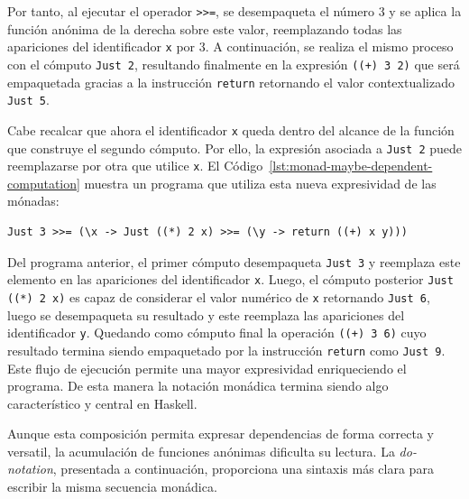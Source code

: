 Por tanto, al ejecutar el operador \verb|>>=|, se desempaqueta el número 3 y se aplica la función anónima de la derecha sobre este valor, reemplazando todas las apariciones del identificador \texttt{x} por 3. A continuación, se realiza el mismo proceso con el cómputo \verb|Just 2|, resultando finalmente en la expresión \texttt{((+) 3 2)} que será empaquetada gracias a la instrucción \texttt{return} retornando el valor contextualizado \texttt{Just 5}.

Cabe recalcar que ahora el identificador \verb|x| queda dentro del alcance de la función que construye el segundo cómputo. Por ello, la expresión asociada a \verb|Just 2| puede reemplazarse por otra que utilice \verb|x|. El Código~\ref{lst:monad-maybe-dependent-computation} muestra un programa que utiliza esta nueva expresividad de las mónadas:

\begin{lstlisting}[style=haskell,caption={Cómputo monádico con dependencia entre resultados intermedios.},label={lst:monad-maybe-dependent-computation}]
    Just 3 >>= (\x -> Just ((*) 2 x) >>= (\y -> return ((+) x y)))
\end{lstlisting}

Del programa anterior, el primer cómputo desempaqueta \verb|Just 3| y reemplaza este elemento en las apariciones del identificador \verb|x|. Luego, el cómputo posterior \verb|Just ((*) 2 x)| es capaz de considerar el valor numérico de \verb|x| retornando \verb|Just 6|, luego se desempaqueta su resultado y este reemplaza las apariciones del identificador \verb|y|. Quedando como cómputo final la operación \verb|((+) 3 6)| cuyo resultado termina siendo empaquetado por la instrucción \verb|return| como \verb|Just 9|. Este flujo de ejecución permite una mayor expresividad enriqueciendo el programa. De esta manera la notación monádica termina siendo algo característico y central en \textsf{Haskell}.

Aunque esta composición permita expresar dependencias de forma correcta y versatil, la acumulación de funciones anónimas dificulta su lectura. La \textit{do-notation}, presentada a continuación, proporciona una sintaxis más clara para escribir la misma secuencia monádica.
